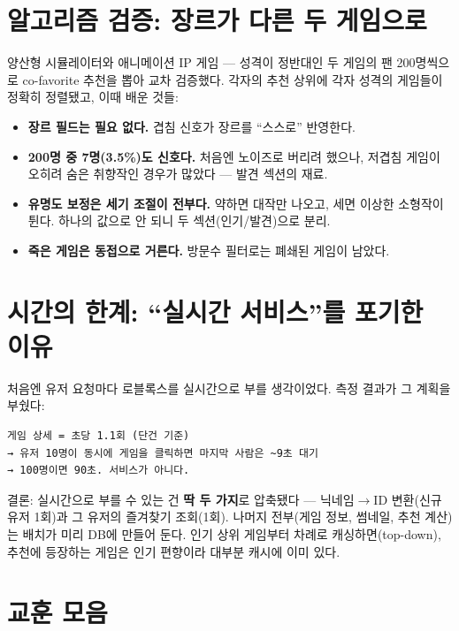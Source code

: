 \documentclass[11pt]{article}
\begin{document}
\section{알고리즘 검증: 장르가 다른 두 게임으로}

양산형 시뮬레이터와 애니메이션 IP 게임 --- 성격이 정반대인 두 게임의 팬 200명씩으로
co-favorite 추천을 뽑아 교차 검증했다. 각자의 추천 상위에 각자 성격의 게임들이
정확히 정렬됐고, 이때 배운 것들:

\begin{itemize}
  \item \textbf{장르 필드는 필요 없다.} 겹침 신호가 장르를 ``스스로'' 반영한다.
  \item \textbf{200명 중 7명(3.5\%)도 신호다.} 처음엔 노이즈로 버리려 했으나,
        저겹침 게임이 오히려 숨은 취향작인 경우가 많았다 --- 발견 섹션의 재료.
  \item \textbf{유명도 보정은 세기 조절이 전부다.} 약하면 대작만 나오고, 세면
        이상한 소형작이 튄다. 하나의 값으로 안 되니 두 섹션(인기/발견)으로 분리.
  \item \textbf{죽은 게임은 동접으로 거른다.} 방문수 필터로는 폐쇄된 게임이 남았다.
\end{itemize}

\section{시간의 한계: ``실시간 서비스''를 포기한 이유}

처음엔 유저 요청마다 로블록스를 실시간으로 부를 생각이었다. 측정 결과가 그 계획을
부쉈다:

\begin{Verbatim}[frame=single, fontsize=\small]
게임 상세 = 초당 1.1회 (단건 기준)
→ 유저 10명이 동시에 게임을 클릭하면 마지막 사람은 ~9초 대기
→ 100명이면 90초. 서비스가 아니다.
\end{Verbatim}

결론: 실시간으로 부를 수 있는 건 \textbf{딱 두 가지}로 압축됐다 ---
닉네임$\to$ID 변환(신규 유저 1회)과 그 유저의 즐겨찾기 조회(1회).
나머지 전부(게임 정보, 썸네일, 추천 계산)는 배치가 미리 DB에 만들어 둔다.
인기 상위 게임부터 차례로 캐싱하면(top-down), 추천에 등장하는 게임은 인기 편향이라
대부분 캐시에 이미 있다.

\section{교훈 모음}
\end{document}
